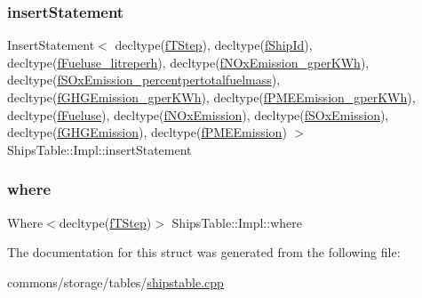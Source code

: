 \subsubsection{\texorpdfstring{insertStatement}{insertStatement}}
{\footnotesize\ttfamily Insert\+Statement$<$ decltype(\mbox{\hyperlink{struct_ships_table_1_1_impl_a5349975645b3eb74fe50510c44cc7ffb}{f\+T\+Step}}), decltype(\mbox{\hyperlink{struct_ships_table_1_1_impl_a50136df8b124ebd45e97142ee1e0e19e}{f\+Ship\+Id}}), decltype(\mbox{\hyperlink{struct_ships_table_1_1_impl_a74262a4b0a8c274d4c6d2b865f166a4f}{f\+Fueluse\+\_\+litreperh}}), decltype(\mbox{\hyperlink{struct_ships_table_1_1_impl_ac0c35c7a9d264fc3269376e25c173718}{f\+N\+Ox\+Emission\+\_\+gper\+K\+Wh}}), decltype(\mbox{\hyperlink{struct_ships_table_1_1_impl_afb5a137533b442216a6ee10fb6d0c5f7}{f\+S\+Ox\+Emission\+\_\+percentpertotalfuelmass}}), decltype(\mbox{\hyperlink{struct_ships_table_1_1_impl_a1ab1d9871411b949d1c0aa2094def1ad}{f\+G\+H\+G\+Emission\+\_\+gper\+K\+Wh}}), decltype(\mbox{\hyperlink{struct_ships_table_1_1_impl_a6ca431ea16c9cc70afb8a37e844fd7d3}{f\+P\+M\+E\+Emission\+\_\+gper\+K\+Wh}}), decltype(\mbox{\hyperlink{struct_ships_table_1_1_impl_a92d2ff078567c54fd9caaea72b3a2b66}{f\+Fueluse}}), decltype(\mbox{\hyperlink{struct_ships_table_1_1_impl_a0cf4f3a3fef002e3fcf44cad3652ed39}{f\+N\+Ox\+Emission}}), decltype(\mbox{\hyperlink{struct_ships_table_1_1_impl_a81b4ad6a2480a51ac1fe59072ea48f08}{f\+S\+Ox\+Emission}}), decltype(\mbox{\hyperlink{struct_ships_table_1_1_impl_ab0f4e9ae1ef2729926f1f9f2130e31f3}{f\+G\+H\+G\+Emission}}), decltype(\mbox{\hyperlink{struct_ships_table_1_1_impl_a6e5837ad78a1a253dd1289ff1d73ce80}{f\+P\+M\+E\+Emission}}) $>$ Ships\+Table\+::\+Impl\+::insert\+Statement}

\mbox{\label{struct_ships_table_1_1_impl_a8ab829285cf4d7a01fb877dc5e8c220e}} 
\subsubsection{\texorpdfstring{where}{where}}
{\footnotesize\ttfamily Where$<$decltype(\mbox{\hyperlink{struct_ships_table_1_1_impl_a5349975645b3eb74fe50510c44cc7ffb}{f\+T\+Step}})$>$ Ships\+Table\+::\+Impl\+::where}



The documentation for this struct was generated from the following file\+:\begin{DoxyCompactItemize}
\item 
commons/storage/tables/\mbox{\hyperlink{shipstable_8cpp}{shipstable.\+cpp}}\end{DoxyCompactItemize}
